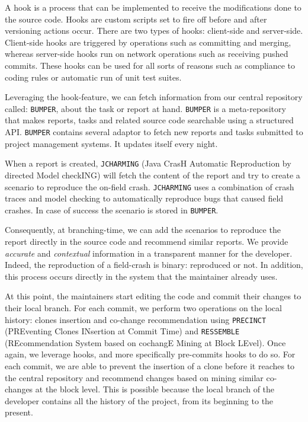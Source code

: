 A hook is a process that can be implemented to receive the  modifications done to the source code.
Hooks are custom scripts set to fire off before and after versioning actions occur.
There are two types of hooks: client-side and server-side.
Client-side hooks are triggered by operations such as committing and merging, whereas server-side hooks run on network operations such as receiving pushed commits.
These hooks can be used for all sorts of reasons such as compliance to coding rules or automatic run of unit test suites.

Leveraging the hook-feature, we can fetch information from our central repository called: {\tt BUMPER}, about the task or report at hand.
{\tt BUMPER} is a meta-repository that makes reports, tasks and related source code searchable using a structured API.
{\tt BUMPER} contains several adaptor to fetch new reports and tasks submitted to project management systems.
It updates itself every night.

When a report is created, {\tt JCHARMING} (Java CrasH Automatic Reproduction by directed Model checkING) will fetch the content of the report and try to create a scenario to reproduce the on-field crash.
{\tt JCHARMING} uses a combination of crash traces and model
checking to automatically reproduce bugs that caused field crashes.
In case of success the scenario is stored in {\tt BUMPER}.

Consequently, at branching-time, we can add the scenarios to reproduce the report directly in the source code and recommend similar reports.
We provide {\it accurate} and {\it contextual} information in a transparent manner for the developer.
Indeed, the reproduction of a field-crash is binary: reproduced or not.
In addition, this process occurs directly in the  system that the maintainer already uses.

At this point, the maintainers start editing the code and commit their changes to their local branch.
For each commit, we perform two operations on the local history: clones insertion and co-change recommendation using {\tt PRECINCT} (PREventing Clones INsertion at Commit Time) and {\tt RESSEMBLE} (REcommendation System based on cochangE Mining at Block LEvel).
Once again, we leverage hooks, and more specifically pre-commits hooks to do so.
For each commit, we are able to prevent the insertion of a clone before it reaches to the central repository and recommend changes based on mining similar co-changes at the block level.
This is possible because the local branch of the developer contains all the history of the project, from its beginning to the present.

